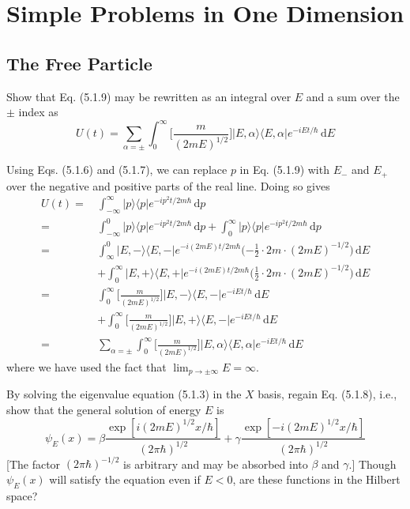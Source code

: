 \documentclass[../principles-of-quantum-mechanics.tex]{subfiles}
\begin{document}
	\printanswers
	
	\section{Simple Problems in One Dimension}
	
	\begin{questions}
		\setcounter{subsection}{0}
		\setcounter{question}{0}
		\subsection{The Free Particle}
		\question Show that Eq. (5.1.9) may be rewritten as an integral over $E$ and a sum over the $\pm$ index as
		$$U(t) = \sum_{\alpha=\pm}\int_0^\infty\Big[\frac{m}{(2mE)^{1/2}}\Big]|E,\alpha\rangle\langle E, \alpha|e^{-iEt/\hbar}\,\mathrm{d}E$$
		
		\begin{solution}
			Using Eqs. (5.1.6) and (5.1.7), we can replace $p$ in Eq. (5.1.9) with $E_-$ and $E_+$ over the negative and positive parts of the real line. Doing so gives
			\begin{align*}
				U(t) =\,&\int_{-\infty}^{\infty}|p\rangle\langle p|e^{-ip^2t/2m\hbar}\,\mathrm{d}p \\
				=\,&\int_{-\infty}^{0}|p\rangle\langle p|e^{-ip^2t/2m\hbar}\,\mathrm{d}p + \int_{0}^{\infty}|p\rangle\langle p|e^{-ip^2t/2m\hbar}\,\mathrm{d}p \\
				=\,&\int_{\infty}^{0}|E, -\rangle\langle E, -|e^{-i(2mE)t/2m\hbar}\Big({-\frac{1}{2}}\cdot 2m \cdot(2mE)^{-1/2}\Big)\,\mathrm{d}E \\
				&+ \int_{0}^{\infty}|E, +\rangle\langle E, +|e^{-i(2mE)t/2m\hbar}\Big({\frac{1}{2}}\cdot 2m \cdot(2mE)^{-1/2}\Big)\,\mathrm{d}E \\
				=\,&\int_{0}^{\infty}\Big[\frac{m}{(2mE)^{1/2}}\Big]|E,-\rangle\langle E, -|e^{-iEt/\hbar}\,\mathrm{d}E \\
				&+ \int_0^{\infty}\Big[\frac{m}{(2mE)^{1/2}}\Big]|E, +\rangle\langle E, -|e^{-iEt/\hbar}\,\mathrm{d}E \\
				=\,&\sum_{\alpha=\pm}\int_0^\infty\Big[\frac{m}{(2mE)^{1/2}}\Big]|E,\alpha\rangle\langle E, \alpha|e^{-iEt/\hbar}\,\mathrm{d}E
			\end{align*}
			where we have used the fact that $\lim_{p\to\pm\infty}E = \infty$.
		\end{solution}
		
		\question By solving the eigenvalue equation (5.1.3) in the $X$ basis, regain Eq. (5.1.8), i.e., show that the general solution of energy $E$ is
		$$\psi_E(x) = \beta\frac{\exp[i(2mE)^{1/2}x/\hbar]}{(2\pi\hbar)^{1/2}} + \gamma\frac{\exp[-i(2mE)^{1/2}x/\hbar]}{(2\pi\hbar)^{1/2}}$$
		[The factor $(2\pi\hbar)^{-1/2}$ is arbitrary and may be absorbed into $\beta$ and $\gamma$.] Though $\psi_E(x)$ will satisfy the equation even if $E<0$, are these functions in the Hilbert space?
		

\end{questions}
\end{document}

